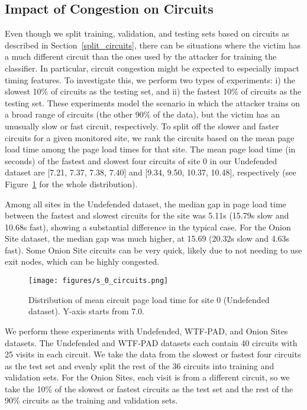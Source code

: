 \documentclass[USenglish,oneside,twocolumn]{article}
\begin{document}
\subsection{Impact of Congestion on Circuits}
\label{congestion_circuits}
Even though we split training, validation, and testing sets based on circuits as described in Section~\ref{split_circuits}, there can be situations where the victim has a much different circuit than the ones used by the attacker for training the classifier. In particular, circuit congestion might be expected to especially impact timing features. To investigate this, we perform two types of experiments: i) the slowest 10\% of circuits as the testing set, and ii) the fastest 10\% of circuits as the testing set. These experiments model the scenario in which the attacker trains on a broad range of circuits (the other 90\% of the data), but the victim has an unusually slow or fast circuit, respectively. To split off the slower and faster circuits for a given monitored site, we rank the circuits based on the mean page load time among the page load times for that site. The mean page load time (in seconds) of the fastest and slowest four circuits of site 0 in our Undefended dataset are [7.21, 7.37, 7.38, 7.40] and [9.34, 9.50, 10.37, 10.48], respectively (see Figure~\ref{circuit_site_0} for the whole distribution). 

Among all sites in the Undefended dataset, the median gap in page load time between the fastest and slowest circuits for the site was 5.11s (15.79s slow and 10.68s fast), showing a substantial difference in the typical case. For the Onion Site dataset, the median gap was much higher, at 15.69 (20.32s slow and 4.63s fast). Some Onion Site circuits can be very quick, likely due to not needing to use exit nodes, which can be highly congested.










\begin{figure}[!t]
        \centering \vskip -0.4cm
        \texttt{[image: figures/s\_0\_circuits.png]}
\caption{Distribution of mean circuit page load time for site 0 (Undefended dataset). Y-axis starts from 7.0.}
        \label{circuit_site_0}
        \vskip -0.2cm
\end{figure}






We perform these experiments with Undefended, WTF-PAD, and Onion Sites datasets. The Undefended and WTF-PAD datasets each contain 40 circuits with 25 visits in each circuit. We take the data from the slowest or fastest four circuits as the test set and evenly split the rest of the 36 circuits into training and validation sets. For the Onion Sites, each visit is from a different circuit, so we take the 10\% of the slowest or fastest circuits as the test set and the rest of the 90\% circuits as the training and validation sets.
\end{document}
